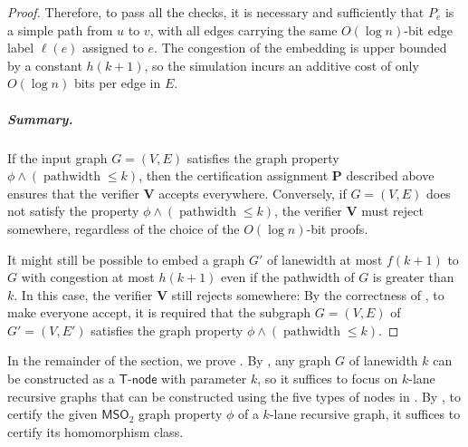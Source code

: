 \documentclass[11pt]{article}
\theoremstyle{definition}
\theoremstyle{remark}
\newcommand{\MSO}{\mathsf{MSO}_2}
\newcommand{\tnode}{\mathsf{T}\text{-}\mathsf{node}}
\begin{document}
\begin{proof}
Therefore, to pass all the checks, it is necessary and sufficiently that $P_e$ is a simple path from $u$ to $v$, with all edges carrying the same $O(\log n)$-bit edge label $\ell(e)$ assigned to $e$. The congestion of the embedding is upper bounded by a constant $h(k+1)$, so the simulation incurs an additive cost of only $O(\log n)$ bits per edge in $E$.

\subparagraph{Summary.} If the input graph $G = (V, E)$ satisfies the graph property $\phi \wedge (\operatorname{pathwidth} \leq k)$, then the certification assignment $\mathbf{P}$ described above ensures that the verifier $\mathbf{V}$ accepts everywhere. Conversely, if $G = (V, E)$ does not satisfy the property $\phi \wedge (\operatorname{pathwidth} \leq k)$, the verifier $\mathbf{V}$ must reject somewhere, regardless of the choice of the $O(\log n)$-bit proofs.

It might still be possible to embed a graph $G'$ of lanewidth at most $f(k+1)$ to $G$ with congestion at most $h(k+1)$ even if the pathwidth of $G$ is greater than $k$. In this case, the verifier $\mathbf{V}$ still rejects somewhere: By the correctness of , to make everyone accept, it is required that the subgraph $G=(V,E)$ of $G'=(V,E')$ satisfies the graph property $\phi \wedge (\operatorname{pathwidth}\leq k)$.
\end{proof}

In the remainder of the section, we prove . By , any graph $G$ of lanewidth $k$ can be constructed as a $\tnode$ with parameter $k$, so it suffices to focus on $k$-lane recursive graphs that can be constructed using the five types of nodes in . By , to certify the given $\MSO$ graph property $\phi$ of a $k$-lane recursive graph, it suffices to certify its homomorphism class. 
\end{document}
